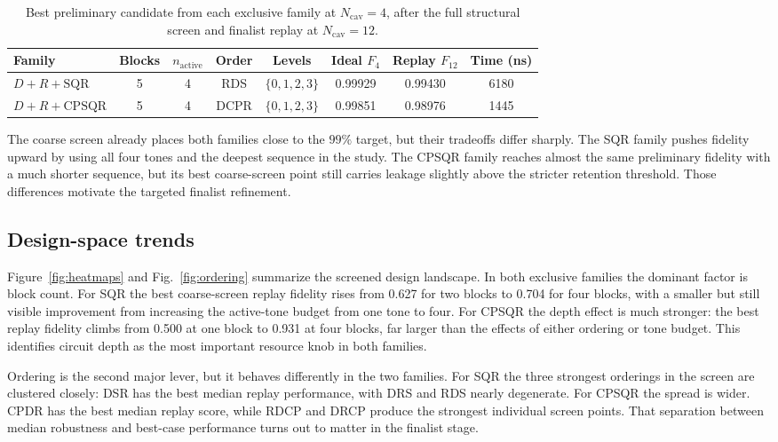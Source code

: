 ﻿\documentclass[aps,pra,twocolumn,reprint,amsmath,amssymb,floatfix]{revtex4-2}
\begin{document}
\begin{table}[t]
\centering
\caption{Best preliminary candidate from each exclusive family at
$N_{\mathrm{cav}}=4$, after the full structural screen and finalist replay at
$N_{\mathrm{cav}}=12$.}
\label{tab:prelim}
\begin{tabular}{@{}lccccccc@{}}
\toprule
Family & Blocks & $n_{\mathrm{active}}$ & Order & Levels & Ideal $F_4$ & Replay $F_{12}$ & Time (ns) \\
\midrule
$D+R+\mathrm{SQR}$ & 5 & 4 & RDS & $\{0,1,2,3\}$ & 0.99929 & 0.99430 & 6180 \\
$D+R+\mathrm{CPSQR}$ & 5 & 4 & DCPR & $\{0,1,2,3\}$ & 0.99851 & 0.98976 & 1445 \\
\bottomrule
\end{tabular}
\end{table}

The coarse screen already places both families close to the $99\%$ target, but
their tradeoffs differ sharply. The SQR family pushes fidelity upward by using
all four tones and the deepest sequence in the study. The CPSQR family reaches
almost the same preliminary fidelity with a much shorter sequence, but its best
coarse-screen point still carries leakage slightly above the stricter
retention threshold. Those differences motivate the targeted finalist
refinement.

\subsection{Design-space trends}

Figure~\ref{fig:heatmaps} and Fig.~\ref{fig:ordering} summarize the screened
design landscape. In both exclusive families the dominant factor is block
count. For SQR the best coarse-screen replay fidelity rises from 0.627 for two
blocks to 0.704 for four blocks, with a smaller but still visible improvement
from increasing the active-tone budget from one tone to four. For CPSQR the
depth effect is much stronger: the best replay fidelity climbs from 0.500 at
one block to 0.931 at four blocks, far larger than the effects of either
ordering or tone budget. This identifies circuit depth as the most important
resource knob in both families.

Ordering is the second major lever, but it behaves differently in the two
families. For SQR the three strongest orderings in the screen are clustered
closely: DSR has the best median replay performance, with DRS and RDS nearly
degenerate. For CPSQR the spread is wider. CPDR has the best median replay
score, while RDCP and DRCP produce the strongest individual screen points.
That separation between median robustness and best-case performance turns out
to matter in the finalist stage.
\end{document}

